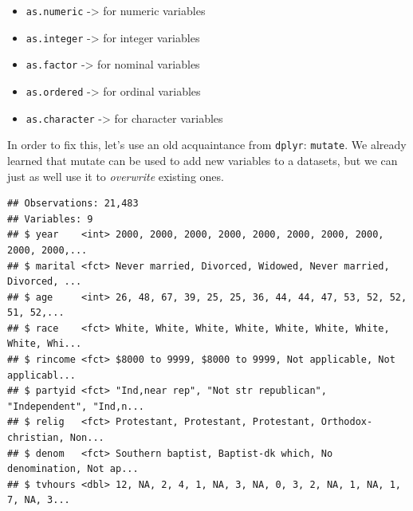 \documentclass[]{tufte-book}
\newenvironment{Shaded}{}{}
\newcommand{\DataTypeTok}[1]{\textcolor[rgb]{0.56,0.13,0.00}{#1}}
\newcommand{\KeywordTok}[1]{\textcolor[rgb]{0.00,0.44,0.13}{\textbf{#1}}}
\newcommand{\NormalTok}[1]{#1}
\newcommand{\OperatorTok}[1]{\textcolor[rgb]{0.40,0.40,0.40}{#1}}
\newcommand{\StringTok}[1]{\textcolor[rgb]{0.25,0.44,0.63}{#1}}
\providecommand{\tightlist}{%
  \setlength{\itemsep}{0pt}\setlength{\parskip}{0pt}}
\begin{document}
\begin{itemize}
\tightlist
\item
  \texttt{as.numeric} -\textgreater{} for numeric variables
\item
  \texttt{as.integer} -\textgreater{} for integer variables
\item
  \texttt{as.factor} -\textgreater{} for nominal variables
\item
  \texttt{as.ordered} -\textgreater{} for ordinal variables
\item
  \texttt{as.character} -\textgreater{} for character variables
\end{itemize}

In order to fix this, let's use an old acquaintance from \texttt{dplyr}: \texttt{mutate}. We already learned that mutate can be used to add new variables to a datasets, but we can just as well use it to \emph{overwrite} existing ones.

\begin{Shaded}
\end{Shaded}

\begin{verbatim}
## Observations: 21,483
## Variables: 9
## $ year    <int> 2000, 2000, 2000, 2000, 2000, 2000, 2000, 2000, 2000, 2000,...
## $ marital <fct> Never married, Divorced, Widowed, Never married, Divorced, ...
## $ age     <int> 26, 48, 67, 39, 25, 25, 36, 44, 44, 47, 53, 52, 52, 51, 52,...
## $ race    <fct> White, White, White, White, White, White, White, White, Whi...
## $ rincome <fct> $8000 to 9999, $8000 to 9999, Not applicable, Not applicabl...
## $ partyid <fct> "Ind,near rep", "Not str republican", "Independent", "Ind,n...
## $ relig   <fct> Protestant, Protestant, Protestant, Orthodox-christian, Non...
## $ denom   <fct> Southern baptist, Baptist-dk which, No denomination, Not ap...
## $ tvhours <dbl> 12, NA, 2, 4, 1, NA, 3, NA, 0, 3, 2, NA, 1, NA, 1, 7, NA, 3...
\end{verbatim}
\end{document}
